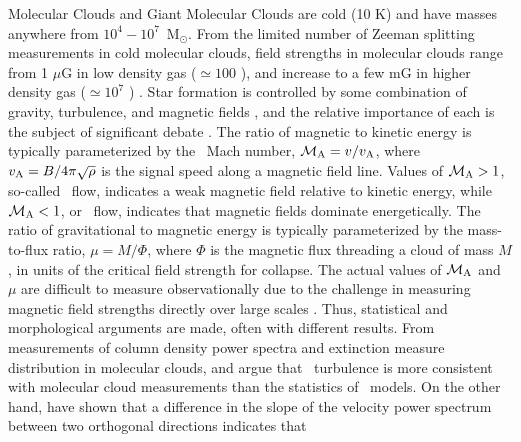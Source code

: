 

Molecular Clouds and Giant Molecular Clouds are cold (10 K) and have masses
anywhere from $10^4-10^7$~M$_\odot$.  From the limited number of Zeeman splitting measurements in cold molecular
clouds, field strengths in molecular clouds range from 1 $\mu$G in low
density  gas ($\simeq 100$ \percc), and increase to a few mG in higher density gas
($\simeq 10^7$ \percc) \citep{Crutcher12}.  Star formation is controlled by some
combination of gravity, turbulence, and magnetic fields \citep{McKee07}, and 
the relative
importance of each is the subject of significant debate \citep[compare, e.g.,][]{Padoan13,
Li14}.   
The ratio of
magnetic to kinetic energy is typically parameterized by the \alf\ Mach number,
$\mathcal{M_{\rm{A}}}=v/v_{\rm{A}}$, where $v_{\rm{A}} = B/4 \pi \sqrt{\rho}$ is the signal
speed along a magnetic field line.  Values of $\mathcal{M_{\rm{A}}}>1$, so-called \sa\
flow, indicates a weak magnetic field relative to kinetic energy, while
$\mathcal{M_{\rm{A}}}<1$, or \suba\ flow, indicates that magnetic fields dominate energetically.  The ratio of
gravitational to magnetic energy is typically parameterized by the mass-to-flux
ratio, $\mu=M/\Phi$, where $\Phi$ is the magnetic flux threading a cloud of mass
$M$, in units of the critical field strength for collapse.  The actual values of
$\mathcal{M_{\rm{A}}}$ and $\mu$ are difficult to
measure observationally due to the challenge in measuring magnetic
field strengths directly over large scales
\citep{Crutcher12}. 
 Thus, statistical and morphological arguments are made,
often with different results.   From measurements of column density power
spectra and extinction measure distribution in molecular clouds,
\cite{Padoan99} and \cite{Padoan04c} argue that \sa\ turbulence is more
consistent with molecular cloud measurements than the statistics of \suba\
models.  On the other hand, \cite{Heyer12} have shown that a difference in the
slope of the velocity power spectrum between two orthogonal directions indicates that

